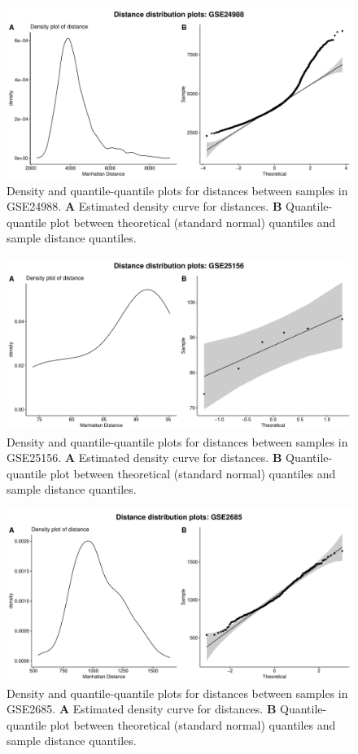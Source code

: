 \documentclass[10pt,letterpaper]{article}\usepackage[]{graphicx}\usepackage[]{color}
\begin{document}
\begin{figure}[H]
	\includegraphics[width=\textwidth]{manhattan-distance_hist_GSE24988.pdf}
	\caption{Density and quantile-quantile plots for distances between samples in GSE24988. \textbf{A} Estimated density curve for distances. \textbf{B} Quantile-quantile plot between theoretical (standard normal) quantiles and sample distance quantiles.}
\end{figure}

\begin{figure}[H]
	\includegraphics[width=\textwidth]{manhattan-distance_hist_GSE25156.pdf}
	\caption{Density and quantile-quantile plots for distances between samples in GSE25156. \textbf{A} Estimated density curve for distances. \textbf{B} Quantile-quantile plot between theoretical (standard normal) quantiles and sample distance quantiles.}
\end{figure}

\begin{figure}[H]
	\includegraphics[width=\textwidth]{manhattan-distance_hist_GSE2685.pdf}
	\caption{Density and quantile-quantile plots for distances between samples in GSE2685. \textbf{A} Estimated density curve for distances. \textbf{B} Quantile-quantile plot between theoretical (standard normal) quantiles and sample distance quantiles.}
\end{figure}
\end{document}
